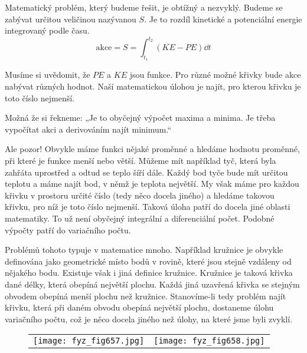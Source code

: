     Matematický problém, který budeme řešit, je obtížný a nezvyklý. Budeme se zabývat určitou
    veličinou nazývanou  \(S\). Je to rozdíl kinetické a potenciální energie
    integrovaný podle času.
    \begin{equation*}
      \text{akce} = S = \int_{t_1}^{t_2}\left(KE - PE\right)\dd{t}
    \end{equation*}

    Musíme si uvědomit, že \(PE\) a \(KE\) jsou funkce. Pro různé možné křivky bude akce nabývat
    různých hodnot. Naší matematickou úlohou je najít, pro kterou křivku je toto číslo nejmenší.

    Možná že si řekneme: „Je to obyčejný výpočet maxima a minima. Je třeba vypočítat akci a
    derivováním najít minimum.“

    Ale pozor! Obvykle máme funkci nějaké proměnné a hledáme hodnotu proměnné, při které je funkce
    menší nebo větší. Můžeme mít například tyč, která byla zahřáta uprostřed a odtud se teplo šíří
    dále. Každý bod tyče bude mít určitou teplotu a máme najít bod, v němž je teplota největší. My
    však máme pro každou křivku v prostoru určité číslo (tedy něco docela jiného) a hledáme takovou
    křivku, pro níž je toto číslo nejmenší. Taková úloha patří do docela jiné oblasti matematiky. To
    už není obyčejný integrální a diferenciální počet. Podobné výpočty patří do variačního počtu.

    Problémů tohoto typuje v matematice mnoho. Například kružnice je obvykle definována jako
    geometrické místo bodů v rovině, které jsou stejně vzdáleny od nějakého bodu. Existuje však
    i jiná definice kružnice. Kružnice je taková křivka dané délky, která obepíná největší plochu.
    Každá jiná uzavřená křivka se stejným obvodem obepíná menší plochu než kružnice. Stanovíme-li
    tedy problém najít křivku, která při daném obvodu obepíná největší plochu, dostaneme úlohu
    variačního počtu, což je něco docela jiného než úlohy, na které jsme byli
    zvyklí.

    \begin{figure}[ht!]  
      \centering
      \begin{tabular}{cc}
        \texttt{[image: fyz\_fig657.jpg]}             &                                                        
        \texttt{[image: fyz\_fig658.jpg]}
      \end{tabular}
    \end{figure}
    
